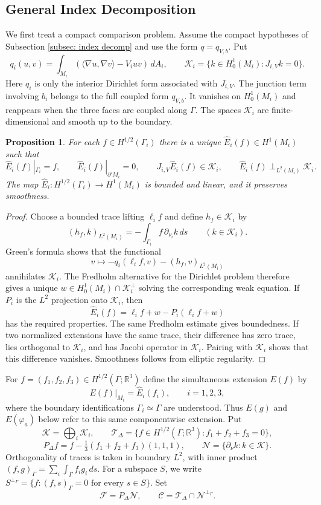 \documentclass[11pt,twoside]{amsart}
\newtheorem{prop}[thm]{Proposition}
\numberwithin{equation}{section}
\begin{document}
\subsection{General Index Decomposition}
We first treat a compact comparison problem. Assume the compact hypotheses of Subsection \ref{subsec: index decomp} and use the form $q=q_{V,b}$. Put
\[
q_i(u,v)=\int_{M_i}(\langle\nabla u,\nabla v\rangle-V_iuv)\,dA_i,
\qquad
\mathcal K_i=\{k\in H_0^1(M_i):J_{i,V}k=0\}.
\]
Here $q_i$ is only the interior Dirichlet form associated with $J_{i,V}$. The junction term involving $b_i$ belongs to the full coupled form $q_{V,b}$. It vanishes on $H_0^1(M_i)$ and reappears when the three faces are coupled along $\Gamma$. The spaces $\mathcal K_i$ are finite-dimensional and smooth up to the boundary.

\begin{prop}\label{prop: compact normalized extension}
For each $f\in H^{1/2}(\Gamma_i)$ there is a unique $\hat E_i(f)\in H^1(M_i)$ such that
\[
\hat E_i(f)|_{\Gamma_i}=f,
\qquad \hat E_i(f)|_{\partial'M_i}=0,
\qquad J_{i,V}\hat E_i(f)\in\mathcal K_i,
\qquad \hat E_i(f)\perp_{L^2(M_i)}\mathcal K_i.
\]
The map $\hat E_i:H^{1/2}(\Gamma_i)\to H^1(M_i)$ is bounded and linear, and it preserves smoothness.
\end{prop}
\begin{proof}
Choose a bounded trace lifting $\ell_i f$ and define $h_f\in\mathcal K_i$ by
\[
(h_f,k)_{L^2(M_i)}=-\int_{\Gamma_i}f\,\partial_{\nu_i}k\,ds
\qquad(k\in\mathcal K_i).
\]
Green's formula shows that the functional
\[
v\longmapsto-q_i(\ell_i f,v)-(h_f,v)_{L^2(M_i)}
\]
annihilates $\mathcal K_i$. The Fredholm alternative for the Dirichlet problem therefore gives a unique $w\in H_0^1(M_i)\cap\mathcal K_i^{\perp}$ solving the corresponding weak equation. If $P_i$ is the $L^2$ projection onto $\mathcal K_i$, then
\[
\hat E_i(f)=\ell_i f+w-P_i(\ell_i f+w)
\]
has the required properties. The same Fredholm estimate gives boundedness. If two normalized extensions have the same trace, their difference has zero trace, lies orthogonal to $\mathcal K_i$, and has Jacobi operator in $\mathcal K_i$. Pairing with $\mathcal K_i$ shows that this difference vanishes. Smoothness follows from elliptic regularity.
\end{proof}

For $f=(f_1,f_2,f_3)\in H^{1/2}(\Gamma;\mathbb R^3)$ define the simultaneous extension $E(f)$ by
\[
E(f)|_{M_i}=\widehat E_i(f_i),\qquad i=1,2,3,
\]
where the boundary identifications $\Gamma_i\simeq\Gamma$ are understood. Thus $E(g)$ and $E(\varphi_a)$ below refer to this same componentwise extension. Put
\[
\mathcal K=\bigoplus_i\mathcal K_i,
\qquad
\mathcal T_\Delta=\{f\in H^{1/2}(\Gamma;\mathbb R^3):f_1+f_2+f_3=0\},
\]
\[
P_\Delta f=f-\tfrac13(f_1+f_2+f_3)(1,1,1),
\qquad
\mathcal N=\{\partial_\nu k:k\in\mathcal K\}.
\]
Orthogonality of traces is taken in boundary $L^2$, with inner product $(f,g)_\Gamma=\sum_i\int_\Gamma f_i g_i\,ds$. For a subspace $S$, we write $S^{\perp_\Gamma}=\{f:(f,s)_\Gamma=0\text{ for every }s\in S\}$. Set
\[
\mathcal F=P_\Delta\mathcal N,
\qquad
\mathcal C=\mathcal T_\Delta\cap\mathcal N^{\perp_\Gamma}.
\]
\end{document}
